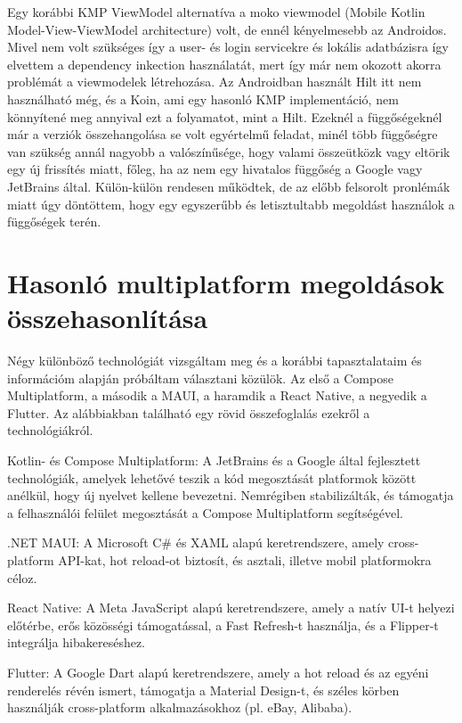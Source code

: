 Egy korábbi KMP ViewModel alternatíva a moko viewmodel (Mobile Kotlin Model-View-ViewModel architecture) volt, de ennél kényelmesebb az Androidos.
Mivel nem volt szükséges így a user- és login servicekre és lokális adatbázisra így elvettem a dependency inkection használatát, mert így már nem okozott akorra problémát a viewmodelek létrehozása. Az Androidban használt Hilt itt nem használható még, és a Koin, ami egy hasonló KMP implementáció, nem könnyítené meg annyival ezt a folyamatot, mint a Hilt.
Ezeknél a függőségeknél már a verziók összehangolása se volt egyértelmű feladat, minél több függőségre van szükség annál nagyobb a valószínűsége, hogy valami összeütközk vagy eltörik egy új frissítés miatt, főleg, ha az nem egy hivatalos függőség a Google vagy JetBrains által.
Külön-külön rendesen működtek, de az előbb felsorolt pronlémák miatt úgy döntöttem, hogy egy egyszerűbb és letisztultabb megoldást használok a függőségek terén.

\section{Hasonló multiplatform megoldások összehasonlítása}
\label{sec:SimilarSolutions}

Négy különböző technológiát vizsgáltam meg és a korábbi tapasztalataim és információm alapján próbáltam választani közülök.
Az első a Compose Multiplatform, a második a MAUI, a haramdik a React Native, a negyedik a Flutter.
Az alábbiakban található egy rövid összefoglalás ezekről a technológiákról.

Kotlin- és Compose Multiplatform: A JetBrains és a Google által fejlesztett technológiák, amelyek lehetővé teszik a kód megosztását platformok között anélkül, hogy új nyelvet kellene bevezetni. Nemrégiben stabilizálták, és támogatja a felhasználói felület megosztását a Compose Multiplatform segítségével. \cite{KotlinCrossPlatformFrameworks}

.NET MAUI: A Microsoft C\# és XAML alapú keretrendszere, amely cross-platform API-kat, hot reload-ot biztosít, és asztali, illetve mobil platformokra céloz. \cite{KotlinCrossPlatformFrameworks}

React Native: A Meta JavaScript alapú keretrendszere, amely a natív UI-t helyezi előtérbe, erős közösségi támogatással, a Fast Refresh-t használja, és a Flipper-t integrálja hibakereséshez. \cite{KotlinCrossPlatformFrameworks}

Flutter: A Google Dart alapú keretrendszere, amely a hot reload és az egyéni renderelés révén ismert, támogatja a Material Design-t, és széles körben használják cross-platform alkalmazásokhoz (pl. eBay, Alibaba). \cite{KotlinCrossPlatformFrameworks}


